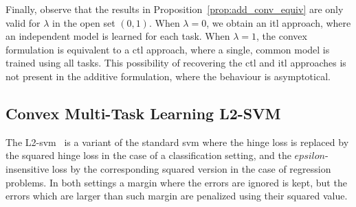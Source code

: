 Finally, observe that the results in Proposition~\ref{prop:add_conv_equiv} are only valid for $\lambda$ in the open set $(0, 1)$. 
When $\lambda=0$, we obtain an \acrshort{itl} approach, where an independent model is learned for each task. When $\lambda=1$, the convex formulation is equivalent to a \acrshort{ctl} approach, where a single, common model is trained using all tasks. This possibility of recovering the \acrshort{ctl} and \acrshort{itl} approaches is not present in the additive formulation, where the behaviour is asymptotical.






\subsection{Convex Multi-Task Learning L2-SVM}
The L2-\acrshort{svm}~\citep{Burges98} is a variant of the standard \acrshort{svm} where the hinge loss is replaced by the squared hinge loss in the case of a classification setting, and the $epsilon$-insensitive loss by the corresponding squared version in the case of regression problems. In both settings a margin where the errors are ignored is kept, but the errors which are larger than such margin are penalized using their squared value.


